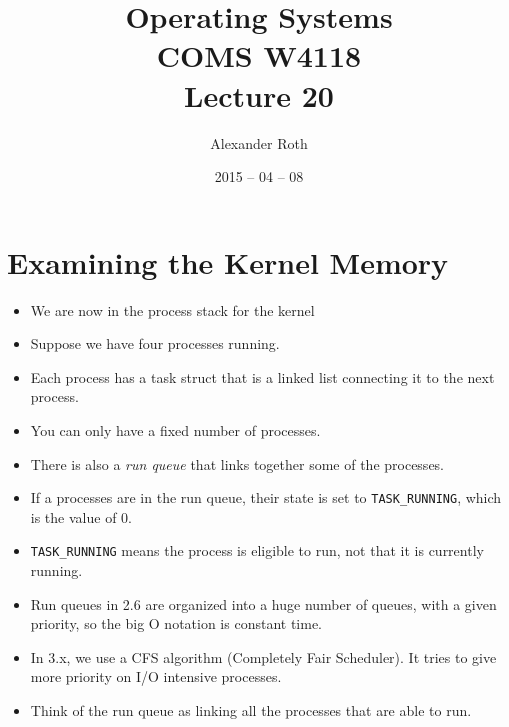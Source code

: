 \documentclass[]{article}
\begin{document}
\newcommand{\code}{\texttt}
\newtheorem{thm}{Theorem}
\title{Operating Systems \\ COMS W4118 \\ Lecture 20}
\author{Alexander Roth}
\date{2015 -- 04 -- 08}
\maketitle

\section{Examining the Kernel Memory}
\begin{itemize}
\item We are now in the process stack for the kernel
\item Suppose we have four processes running.
\item Each process has a task struct that is a linked list connecting it to the
next process.
\item You can only have a fixed number of processes.
\item There is also a \emph{run queue} that links together some of the
processes.
\item If a processes are in the run queue, their state is set to
\code{TASK\_RUNNING}, which is the value of 0.
\item \code{TASK\_RUNNING} means the process is eligible to run, not that it is
currently running.
\item Run queues in 2.6 are organized into a huge number of queues, with a given
priority, so the big O notation is constant time.
\item In 3.x, we use a CFS algorithm (Completely Fair Scheduler). It tries to
give more priority on I/O intensive processes.
\item Think of the run queue as linking all the processes that are able to run.
\end{itemize}
\end{document}
